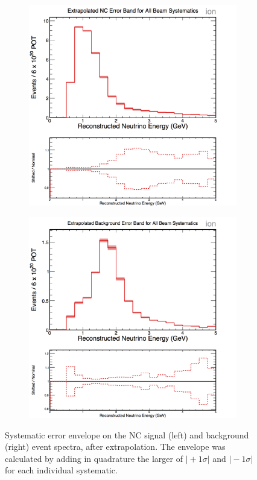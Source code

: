 \begin{figure}[h]
  \centering
  \begin{subfigure}{.48\textwidth}
    \centering
    \includegraphics[width=1\linewidth]{figures/cNCEXBeamSysts.png}
  \end{subfigure}
  \begin{subfigure}{.48\textwidth}
    \centering
    \includegraphics[width=1\linewidth]{figures/cBGEXBeamSysts.png}
  \end{subfigure}
  \caption[Beam Systematic Error Envelopes]{Systematic error envelope on the NC signal (left) and background (right) event spectra, after extrapolation. The envelope was calculated by adding in quadrature the larger of $\vert +1\sigma \vert$ and $\vert -1\sigma \vert$ for each individual systematic.}
  \label{fig:SystBeam}
\end{figure}

